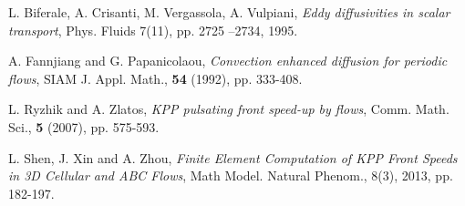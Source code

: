 \documentclass{article}
\begin{document}
\begin{thebibliography}{99}

L. Biferale, A. Crisanti, M. Vergassola, A. Vulpiani,
{\em Eddy diffusivities in scalar transport}, Phys. Fluids 7(11), pp. 2725 --2734, 1995.

 A. Fannjiang and G. Papanicolaou,
{\em Convection enhanced diffusion for periodic flows}, SIAM J.
Appl. Math., {\bf 54} (1992), pp. 333-408.

L. Ryzhik and A. Zlatos,
{\em KPP pulsating front speed-up by flows}, Comm. Math. Sci., {\bf
5} (2007), pp. 575-593.

L. Shen, J. Xin and A. Zhou, {\em Finite Element Computation of KPP
Front Speeds in 3D Cellular and ABC Flows}, Math Model. Natural Phenom., 8(3), 2013, pp. 182-197. 




\end{thebibliography}
\end{document}
